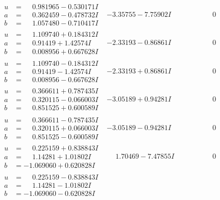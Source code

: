 \documentclass[1p]{elsarticle_modified}
\theoremstyle{definition}
\begin{document}
$$\begin{array}{c|c|c}
\begin{aligned}
u &= \phantom{-}0.981965 - 0.530171 I \\
a &= \phantom{-}0.362459 - 0.478732 I \\
b &= \phantom{-}1.057480 - 0.710417 I\end{aligned}
 & -3.35755 - 7.75902 I & \phantom{-0.000000 } 0 \\ \hline\begin{aligned}
u &= \phantom{-}1.109740 + 0.184312 I \\
a &= \phantom{-}0.91419 + 1.42574 I \\
b &= \phantom{-}0.008956 + 0.667628 I\end{aligned}
 & -2.33193 - 0.86861 I & \phantom{-0.000000 } 0 \\ \hline\begin{aligned}
u &= \phantom{-}1.109740 - 0.184312 I \\
a &= \phantom{-}0.91419 - 1.42574 I \\
b &= \phantom{-}0.008956 - 0.667628 I\end{aligned}
 & -2.33193 + 0.86861 I & \phantom{-0.000000 } 0 \\ \hline\begin{aligned}
u &= \phantom{-}0.366611 + 0.787435 I \\
a &= \phantom{-}0.320115 - 0.066003 I \\
b &= \phantom{-}0.851525 + 0.600589 I\end{aligned}
 & -3.05189 + 0.94281 I & \phantom{-0.000000 } 0 \\ \hline\begin{aligned}
u &= \phantom{-}0.366611 - 0.787435 I \\
a &= \phantom{-}0.320115 + 0.066003 I \\
b &= \phantom{-}0.851525 - 0.600589 I\end{aligned}
 & -3.05189 - 0.94281 I & \phantom{-0.000000 } 0 \\ \hline\begin{aligned}
u &= \phantom{-}0.225159 + 0.838843 I \\
a &= \phantom{-}1.14281 + 1.01802 I \\
b &= -1.069060 + 0.620828 I\end{aligned}
 & \phantom{-}1.70469 - 7.47855 I & \phantom{-0.000000 } 0 \\ \hline\begin{aligned}
u &= \phantom{-}0.225159 - 0.838843 I \\
a &= \phantom{-}1.14281 - 1.01802 I \\
b &= -1.069060 - 0.620828 I\end{aligned}

\end{array}$$
\end{document}
